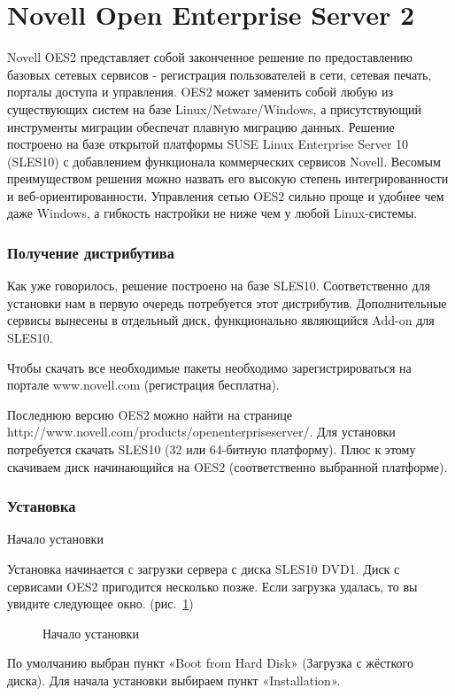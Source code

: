 \part{Novell Open Enterprise Server 2}
Novell OES2 представляет собой законченное решение по предоставлению базовых сетевых сервисов - регистрация пользователей в сети, сетевая печать, порталы доступа и управления. OES2 может заменить собой любую из существующих систем на базе Linux/Netware/Windows, а присутствующий инструменты миграции обеспечат плавную миграцию данных. Решение построено на базе открытой платформы SUSE Linux Enterprise Server 10 (SLES10) с добавлением функционала коммерческих сервисов Novell. Весомым преимуществом решения можно назвать его высокую степень интегрированности и веб-ориентированности. Управления сетью OES2 сильно проще и удобнее чем даже Windows, а гибкость настройки не ниже чем у любой Linux-системы.

\section{Получение дистрибутива}
Как уже говорилось, решение построено на базе SLES10. Соответственно для установки нам в первую очередь потребуется этот дистрибутив. Дополнительные сервисы вынесены в отдельный диск, функционально являющийся Add-on для SLES10.\par
Чтобы скачать все необходимые пакеты необходимо зарегистрироваться на портале www.novell.com (регистрация бесплатна).\par
Последнюю версию OES2 можно найти на странице\\
http://www.novell.com/products/openenterpriseserver/. Для установки потребуется скачать SLES10 (32 или 64-битную платформу). Плюс к этому скачиваем диск начинающийся на OES2 (соответственно выбранной платформе).\\

\section{Установка}
Начало установки

Установка начинается с загрузки сервера с диска SLES10 DVD1. Диск с сервисами OES2 пригодится несколько позже. Если загрузка удалась, то вы увидите следующее окно. (рис.~\ref{fig1})
\begin{figure}[H]
\caption{Начало установки}
\label{fig1}
\end{figure}
По умолчанию выбран пункт «Boot from Hard Disk» (Загрузка с жёсткого диска). Для начала установки выбираем пункт «Installation».\\

